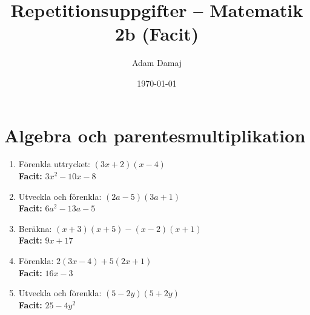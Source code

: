\documentclass[a4paper,11pt]{article}
\title{Repetitionsuppgifter -- Matematik 2b (Facit)}
\author{Adam Damaj}
\date{\today}
\begin{document}
\maketitle

\section{Algebra och parentesmultiplikation}

\begin{enumerate}[label=\textbf{\arabic*.}]
    \item Förenkla uttrycket: $(3x + 2)(x - 4)$
    \\ \textbf{Facit:} $3x^2 - 10x - 8$
    
    \item Utveckla och förenkla: $(2a - 5)(3a + 1)$
    \\ \textbf{Facit:} $6a^2 - 13a - 5$
    
    \item Beräkna: $(x + 3)(x + 5) - (x - 2)(x + 1)$
    \\ \textbf{Facit:} $9x + 17$
    
    \item Förenkla: $2(3x - 4) + 5(2x + 1)$
    \\ \textbf{Facit:} $16x - 3$
    
    \item Utveckla och förenkla: $(5 - 2y)(5 + 2y)$
    \\ \textbf{Facit:} $25 - 4y^2$
\end{enumerate}
\end{document}
